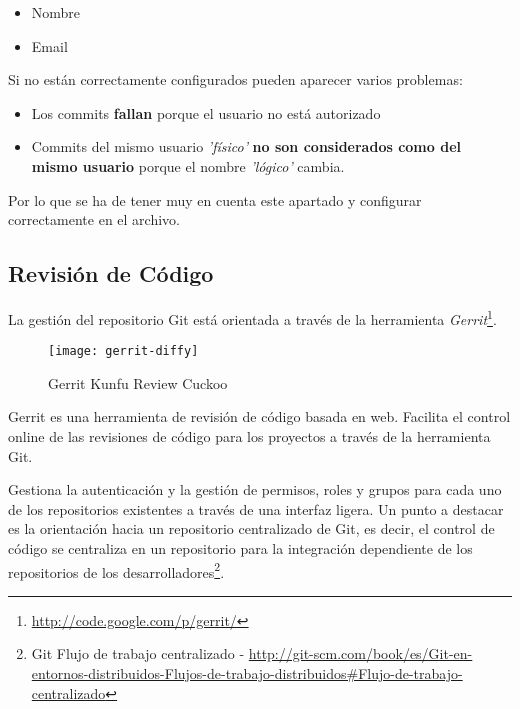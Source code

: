 \begin{itemize}
    \item Nombre
    \item Email
\end{itemize}

\par Si no están correctamente configurados pueden aparecer varios problemas:

\begin{itemize}
    \item Los commits \textbf{fallan} porque el usuario no está autorizado
    \item Commits del mismo usuario \emph{'físico'} \textbf{no son considerados como del mismo usuario} porque el nombre \emph{'lógico'} cambia.
\end{itemize}

\par Por lo que se ha de tener muy en cuenta este apartado y configurar correctamente en el archivo.


\subsection{Revisión de Código}
\label{sub:gerrit}

\par La gestión del repositorio Git está orientada a través de la herramienta \emph{Gerrit}\footnote{\url{http://code.google.com/p/gerrit/}}.

\begin{figure}[H]
    \centering
    \texttt{[image: gerrit-diffy]}
    \caption{Gerrit Kunfu Review Cuckoo}
    \label{fig:gerrit-logo}
\end{figure}

\par Gerrit es una herramienta de revisión de código basada en web. Facilita el control online de las revisiones de código para los proyectos a través de la herramienta Git.

\par Gestiona la autenticación y la gestión de permisos, roles y grupos para cada uno de los repositorios existentes a través de una interfaz ligera. Un punto a destacar es la orientación hacia un repositorio centralizado de Git, es decir, el control de código se centraliza en un repositorio para la integración dependiente de los repositorios de los desarrolladores\footnote{Git Flujo de trabajo centralizado - \url{http://git-scm.com/book/es/Git-en-entornos-distribuidos-Flujos-de-trabajo-distribuidos\#Flujo-de-trabajo-centralizado}}.

